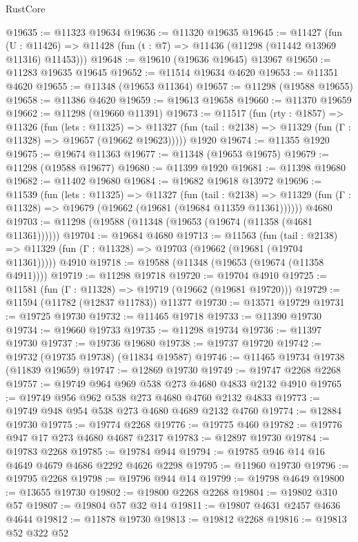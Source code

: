 \begin{lexlean}{RustCore}
\begin{coremodule}
@19635 := @11323 @19634
@19636 := @11320 @19635
@19645 := @11427
    (fun (U : @11426) => @11428 (fun (t : @7) => @11436 (@11298 (@11442 @13969 @11316) @11453)))
@19648 := @19610 (@19636 @19645) @13967
@19650 := @11283 @19635 @19645
@19652 := @11514 @19634 @4620
@19653 := @11351 @4620
@19655 := @11348 (@19653 @11364)
@19657 := @11298 (@19588 @19655)
@19658 := @11386 @4620
@19659 := @19613 @19658
@19660 := @11370 @19659
@19662 := @11298 (@19660 @11391)
@19673 := @11517
    (fun (rty : @1857) =>
    @11326
      (fun (lets : @11325) =>
      @11327 (fun (tail : @2138) => @11329 (fun (Γ : @11328) => @19657 (@19662 @19623)))))
    @1920
@19674 := @11355 @1920
@19675 := @19674 @11363
@19677 := @11348 (@19653 @19675)
@19679 := @11298 (@19588 @19677)
@19680 := @11399 @1920
@19681 := @11398 @19680
@19682 := @11402 @19680
@19684 := @19682 @19618 @13972
@19696 := @11539
    (fun (lets : @11325) =>
    @11327
      (fun (tail : @2138) =>
      @11329 (fun (Γ : @11328) => @19679 (@19662 (@19681 (@19684 @11359 @11361))))))
    @4680
@19703 := @11298 (@19588 (@11348 (@19653 (@19674 (@11358 (@4681 @11361))))))
@19704 := @19684 @4680
@19713 := @11563
    (fun (tail : @2138) => @11329 (fun (Γ : @11328) => @19703 (@19662 (@19681 (@19704 @11361)))))
    @4910
@19718 := @19588 (@11348 (@19653 (@19674 (@11358 @4911))))
@19719 := @11298 @19718
@19720 := @19704 @4910
@19725 := @11581 (fun (Γ : @11328) => @19719 (@19662 (@19681 @19720)))
@19729 := @11594 (@11782 (@12837 @11783)) @11377
@19730 := @13571 @19729
@19731 := @19725 @19730
@19732 := @11465 @19718
@19733 := @11390 @19730
@19734 := @19660 @19733
@19735 := @11298 @19734
@19736 := @11397 @19730
@19737 := @19736 @19680
@19738 := @19737 @19720
@19742 := @19732 (@19735 @19738) (@11834 @19587)
@19746 := @11465 @19734 @19738 (@11839 @19659)
@19747 := @12869 @19730
@19749 := @19747 @2268 @2268
@19757 := @19749 @964 @969 @538 @273 @4680 @4833 @2132 @4910
@19765 := @19749 @956 @962 @538 @273 @4680 @4760 @2132 @4833
@19773 := @19749 @948 @954 @538 @273 @4680 @4689 @2132 @4760
@19774 := @12884 @19730
@19775 := @19774 @2268
@19776 := @19775 @460
@19782 := @19776 @947 @17 @273 @4680 @4687 @2317
@19783 := @12897 @19730
@19784 := @19783 @2268
@19785 := @19784 @944
@19794 := @19785 @946 @14 @16 @4649 @4679 @4686 @2292 @4626 @2298
@19795 := @11960 @19730
@19796 := @19795 @2268
@19798 := @19796 @944 @14
@19799 := @19798 @4649
@19800 := @13655 @19730
@19802 := @19800 @2268 @2268
@19804 := @19802 @310 @57
@19807 := @19804 @57 @32 @14
@19811 := @19807 @4631 @2457 @4636 @4644
@19812 := @11878 @19730
@19813 := @19812 @2268
@19816 := @19813 @52 @322 @52

\end{coremodule}
\end{lexlean}
